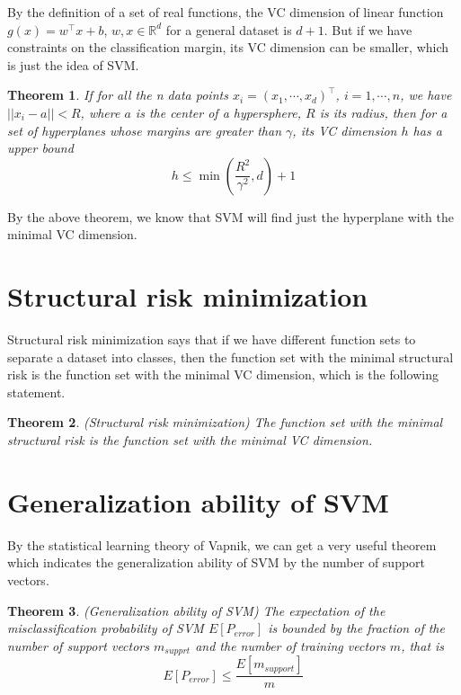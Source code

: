 \documentclass[a4paper]{report}
\newtheorem{theorem}{Theorem}[section]
\begin{document}
By the definition of a set of real functions, the VC dimension of linear function $g(x)=w^\top x+b$, $w,x\in\mathbb R^d$ for a general dataset is $d+1$. But if we have constraints on the classification margin, its VC dimension can be smaller, which is just the idea of SVM.

\begin{theorem}
    If for all the n data points $x_i=(x_1,\cdots,x_d)^\top$, $i=1,\cdots,n$, we have $||x_i-a||<R$, where $a$ is the center of a hypersphere, $R$ is its radius, then for a set of hyperplanes whose margins are greater than $\gamma$, its VC dimension $h$ has a upper bound
    \[
        h\leq \min(\frac{R^2}{\gamma^2},d)+1
    \]
\end{theorem}

By the above theorem, we know that SVM will find just the hyperplane with the minimal VC dimension.

\section{Structural risk minimization}

Structural risk minimization says that if we have different function sets to separate a dataset into classes, then the function set with the minimal structural risk is the function set with the minimal VC dimension, which is the following statement.

\begin{theorem}
    (Structural risk minimization) The function set with the minimal structural risk is the function set with the minimal VC dimension.
\end{theorem}

\section{Generalization ability of SVM}

By the statistical learning theory of Vapnik, we can get a very useful theorem which indicates the generalization ability of SVM by the number of support vectors.

\begin{theorem}
    (Generalization ability of SVM\cite{cortes1995support}) The expectation of the misclassification probability of SVM $E[P_{error}]$ is bounded by the fraction of the number of support vectors $m_{supprt}$ and the number of training vectors $m$, that is
    \[
        E[P_{error}]\leq\frac{E[m_{support}]}{m}
    \]
\end{theorem}
\end{document}
